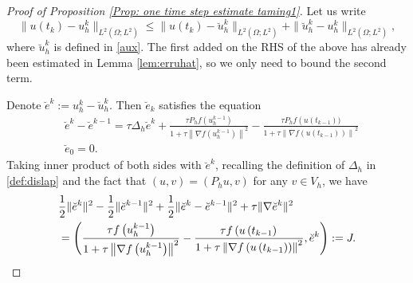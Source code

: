 \documentclass[reqno, 11pt]{amsart}
\theoremstyle{plain}
\theoremstyle{definition}
\theoremstyle{remark}
\numberwithin{equation}{section}
\numberwithin{theorem}{section}
\begin{document}
{\begin{proof}[Proof of Proposition \ref{Prop: one time  step estimate taming1}]
Let us write
$$
\|u(t_k)-u_h^k\|_{L^2(\Omega;L^2)}\leq \|u(t_k)-\breve{u}_h^k\|_{L^2(\Omega;L^2)}+\|\breve{u}_h^k-u_h^k\|_{L^2(\Omega;L^2)}, 
$$
where $\breve{u}_h^k$ is defined in \eqref{aux}. The first added on the RHS of the above has already been estimated in  Lemma \ref{lem:erruhat}, so we only need to bound the second term. 

Denote $\breve{e}^k:=u_h^k-\breve{u}_h^k$. Then $\breve{e}_k$ satisfies the equation
\begin{align}
& \breve{e}^k-\breve{e}^{k-1}= \tau \Delta_h \breve{e}^k+\frac{\tau P_hf\left(u_h^{k-1}\right)}{1+\tau\left\|\nabla f\left(u_h^{k-1}\right)\right\|^2}-\frac{\tau P_h f\left(u\left(t_{k-1}\right))\right.}{1+\tau\left\|\nabla f\left(u\left(t_{k-1}\right)\right)\right\|^2} \\
& \breve{e}_0=0 .
\end{align}
Taking inner product of both sides with $\breve{e}^k$,  recalling the definition of $\Delta_h$ in \eqref{def:dislap} and the fact that $(u,v)=(P_hu,v)$ for any $ v\in V_h$, we have 
\begin{align}\label{eq:J}
& \frac{1}{2}\|\breve{e}^k\|^2-\frac{1}{2}\|\breve{e}^{k-1}\|^2+\frac{1}{2}\|\breve{e}^k-\breve{e}^{k-1}\|^2+\tau\|\nabla \breve{e}^k\|^2\notag \\
& =\left(\frac{\tau f\left(u_h^{k-1}\right)}{1+\tau\left\|\nabla f\left(u_h^{k-1}\right)\right\|^2}-\frac{\tau f\left(u\left(t_{k-1}\right)\right.}{1+\tau\left\|\nabla f\left(u\left(t_{k-1}\right)\right)\right\|^2}, \breve{e}^k\right):=J.
\end{align}


\end{proof}}
\end{document}
